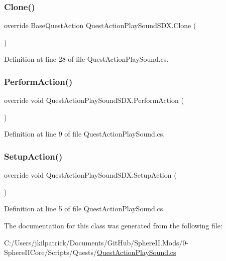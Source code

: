 \subsubsection{\texorpdfstring{Clone()}{Clone()}}
{\footnotesize\ttfamily override Base\+Quest\+Action Quest\+Action\+Play\+Sound\+S\+D\+X.\+Clone (\begin{DoxyParamCaption}{ }\end{DoxyParamCaption})}



Definition at line 28 of file Quest\+Action\+Play\+Sound.\+cs.

\mbox{\label{class_quest_action_play_sound_s_d_x_a388750909751148ff6b1d7cac8d71c6e}} 
\subsubsection{\texorpdfstring{PerformAction()}{PerformAction()}}
{\footnotesize\ttfamily override void Quest\+Action\+Play\+Sound\+S\+D\+X.\+Perform\+Action (\begin{DoxyParamCaption}{ }\end{DoxyParamCaption})}



Definition at line 9 of file Quest\+Action\+Play\+Sound.\+cs.

\mbox{\label{class_quest_action_play_sound_s_d_x_a887c9ac83758b008b58939209df166ec}} 
\subsubsection{\texorpdfstring{SetupAction()}{SetupAction()}}
{\footnotesize\ttfamily override void Quest\+Action\+Play\+Sound\+S\+D\+X.\+Setup\+Action (\begin{DoxyParamCaption}{ }\end{DoxyParamCaption})}



Definition at line 5 of file Quest\+Action\+Play\+Sound.\+cs.



The documentation for this class was generated from the following file\+:\begin{DoxyCompactItemize}
\item 
C\+:/\+Users/jkilpatrick/\+Documents/\+Git\+Hub/\+Sphere\+I\+I.\+Mods/0-\/\+Sphere\+I\+I\+Core/\+Scripts/\+Quests/\mbox{\hyperlink{_quest_action_play_sound_8cs}{Quest\+Action\+Play\+Sound.\+cs}}\end{DoxyCompactItemize}
